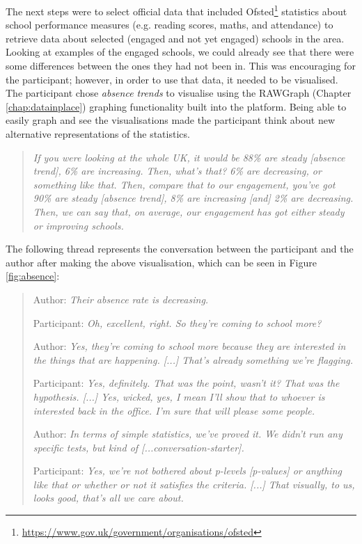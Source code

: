 The next steps were to select official data that included Ofsted\footnote{\url{https://www.gov.uk/government/organisations/ofsted}} statistics about school performance measures (e.g. reading scores, maths, and attendance) to retrieve data about selected (engaged and not yet engaged) schools in the area. Looking at examples of the engaged schools, we could already see that there were some differences between the ones they had not been in. This was encouraging for the participant; however, in order to use that data, it needed to be visualised. The participant chose \textit{absence trends} to visualise using the RAWGraph (Chapter \ref{chap:datainplace}) graphing functionality built into the platform. Being able to easily graph and see the visualisations made the participant think about new alternative representations of the statistics.
\begin{quote}
    \textit{If you were looking at the whole UK, it would be 88\% are steady [absence trend], 6\% are increasing. Then, what's that? 6\% are decreasing, or something like that. Then, compare that to our engagement, you've got 90\% are steady [absence trend], 8\% are increasing [and] 2\% are decreasing. Then, we can say that, on average, our engagement has got either steady or improving schools.}
\end{quote}
The following thread represents the conversation between the participant and the author after making the above visualisation, which can be seen in Figure \ref{fig:absence}:
\begin{quote}
    Author: \textit{Their absence rate is decreasing.}
    
    Participant: \textit{Oh, excellent, right. So they're coming to school more?}
    
    Author: \textit{Yes, they're coming to school more because they are interested in the things that are happening. [...] That's already something we're flagging.}

    Participant: \textit{Yes, definitely. That was the point, wasn't it? That was the hypothesis. [...] Yes, wicked, yes, I mean I'll show that to whoever is interested back in the office. I'm sure that will please some people.}
    
    Author: \textit{In terms of simple statistics, we've proved it. We didn't run any specific tests, but kind of [...conversation-starter].}

    Participant: \textit{Yes, we're not bothered about p-levels [p-values] or anything like that or whether or not it satisfies the criteria. [...] That visually, to us, looks good, that's all we care about.}
\end{quote}

